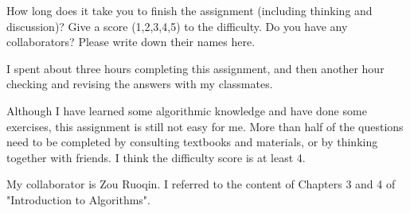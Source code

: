 \documentclass{oxmathproblems}
\begin{document}
\begin{questions}
\miquestion
How long does it take you to finish the assignment (including thinking and discussion)?
Give a score (1,2,3,4,5) to the difficulty.
Do you have any collaborators?
Please write down their names here.\newline
 
I spent about three hours completing this assignment, and then another hour checking and revising the answers with my classmates.

Although I have learned some algorithmic knowledge and have done some exercises, this assignment is still not easy for me. More than half of the questions need to be completed by consulting textbooks and materials, or by thinking together with friends. I think the difficulty score is at least 4.

My collaborator is Zou Ruoqin. I referred to the content of Chapters 3 and 4 of "Introduction to Algorithms".


\end{questions}
\end{document}
